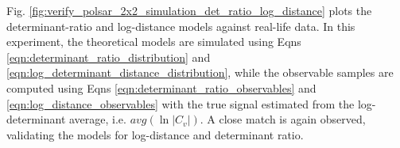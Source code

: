 \documentclass[journal]{IEEEtran}
\begin{document}

Fig. \ref{fig:verify_polsar_2x2_simulation_det_ratio_log_distance} plots the determinant-ratio and log-distance models against real-life data.
In this experiment, the theoretical models are simulated using Eqns \ref{eqn:determinant_ratio_distribution} 
  and \ref{eqn:log_determinant_distance_distribution},
  while the observable samples are computed using Eqns \ref{eqn:determinant_ratio_observables} and \ref{eqn:log_distance_observables}
  with the true signal estimated from the log-determinant average, i.e. $avg(\ln|C_v|)$.
A close match is again observed, validating the models for log-distance and determinant ratio.   
\end{document}
